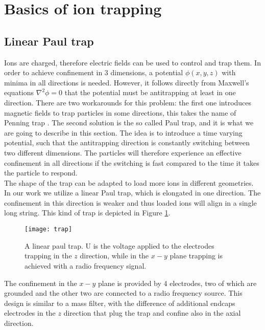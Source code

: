 
\section{Basics of ion trapping}
\subsection{Linear Paul trap}
Ions are charged, therefore electric fields can be used to control and trap them. In order to achieve confinement in 3 dimensions, a potential $\phi(x,y,z)$ with minima in all directions is needed. However, it follows directly from Maxwell's equations $\nabla^2 \phi = 0$ that the potential must be antitrapping at least in one direction. There are two workarounds for this problem: the first one introduces magnetic fields to trap particles in some directions, this takes the name of Penning trap \cite{RevModPhys.58.233}. The second solution is the so called Paul trap, and it is what we are going to describe in this section. The idea is to introduce a time varying potential, such that the antitrapping direction is constantly switching between two different dimensions. The particles will therefore experience an effective confinement in all directions if the switching is fast compared to the time it takes the particle to respond.\\
The shape of the trap can be adapted to load more ions in different geometries. In our work we utilize a linear Paul trap, which is elongated in one direction. The confinement in this direction is weaker and thus loaded ions will align in a single long string. This kind of trap is depicted in Figure \ref{trap}.
\begin{figure}
\centering
\texttt{[image: trap]}
\caption{A linear paul trap. U is the voltage applied to the electrodes trapping in the $z$ direction, while in the $x-y$ plane trapping is achieved with a radio frequency signal.}
\label{trap}
\end{figure}
The confinement in the $x-y$ plane is provided by 4 electrodes, two of which are grounded and the other two are connected to a radio frequency source. This design is similar to a mass filter, with the difference of additional endcaps electrodes in the $z$ direction that plug the trap and confine also in the axial direction.\\
